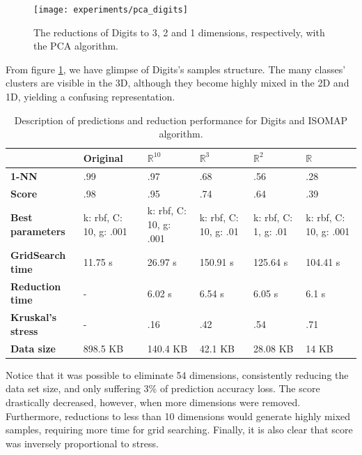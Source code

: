 \begin{figure}[H]
	\centering
	\captionsetup{justification=centering}
	\texttt{[image: experiments/pca\_digits]}
	\caption{The reductions of Digits to 3, 2 and 1 dimensions, respectively, with the PCA algorithm.}
	\label{fig:dsdigitspca}
\end{figure}

From figure \ref{fig:dsdigitspca}, we have glimpse of Digits's samples structure. The many classes' clusters are visible in the 3D, although they become highly mixed in the 2D and 1D, yielding a confusing representation.

\begin{table}[H]
	\centering
	
	\begin{tabular}{|p{.14\linewidth}|p{.14\linewidth}|p{.14\linewidth}|p{.14\linewidth}|p{.14\linewidth}|p{.14\linewidth}|}
		\hline
		& \textbf{Original} & $\mathbb{R}^{10}$ & $\mathbb{R}^3$ & $\mathbb{R}^2$ & $\mathbb{R}$ \\\hline
		\textbf{1-NN} & .99 & .97 & .68 & .56 & .28 \\\hline
		\textbf{Score} & .98 & .95 & .74 & .64 & .39  \\\hline
		\textbf{Best parameters} & k: rbf, C: 10, g: .001 & k: rbf, C: 10, g: .001 & k: rbf, C: 10, g: .01 & k: rbf, C: 1, g: .01 & k: rbf, C: 10, g: .001\\\hline
		\textbf{GridSearch time} & 11.75 s & 26.97 s & 150.91 s & 125.64 s & 104.41 s \\\hline
		\textbf{Reduction time} & - & 6.02 s & 6.54 s & 6.05 s & 6.1 s \\\hline
		\textbf{Kruskal's stress} & - & .16 & .42 & .54 & .71 \\\hline
		\textbf{Data size} & 898.5 KB & 140.4 KB & 42.1 KB & 28.08 KB & 14 KB \\\hline
	\end{tabular}
	
	\caption{Description of predictions and reduction performance for Digits and ISOMAP algorithm.}
\end{table}

Notice that it was possible to eliminate 54 dimensions, consistently reducing the data set size, and only suffering 3\% of prediction accuracy loss. The score drastically decreased, however, when more dimensions were removed. Furthermore, reductions to less than 10 dimensions would generate highly mixed samples, requiring more time for grid searching. Finally, it is also clear that score was inversely proportional to stress.

